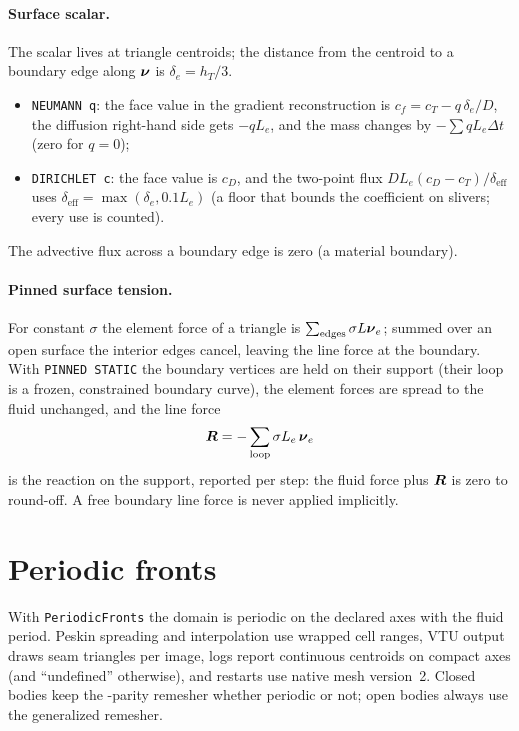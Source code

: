 \paragraph{Surface scalar.} The scalar lives at triangle centroids; the distance from the centroid
to a boundary edge along $\boldsymbol{\nu}$ is $\delta_e=h_T/3$.
\begin{itemize}
  \item \texttt{NEUMANN q}: the face value in the gradient reconstruction is
    $c_f=c_T-q\,\delta_e/D$, the diffusion right-hand side gets $-qL_e$, and the mass changes by
    $-\sum qL_e\Delta t$ (zero for $q=0$);
  \item \texttt{DIRICHLET c}: the face value is $c_D$, and the two-point flux
    $D L_e(c_D-c_T)/\delta_{\text{eff}}$ uses $\delta_{\text{eff}}=\max(\delta_e,0.1L_e)$ (a floor
    that bounds the coefficient on slivers; every use is counted).
\end{itemize}
The advective flux across a boundary edge is zero (a material boundary).

\paragraph{Pinned surface tension.} For constant $\sigma$ the element force of a triangle is
$\sum_{\text{edges}}\sigma L\boldsymbol{\nu}_e$; summed over an open surface the interior edges cancel,
leaving the line force at the boundary. With \texttt{PINNED STATIC} the boundary vertices are held
on their support (their loop is a frozen, constrained boundary curve), the element forces are
spread to the fluid unchanged, and the line force
\begin{equation}
  \boldsymbol{R} = -\sum_{\text{loop}} \sigma L_e\,\boldsymbol{\nu}_e
\end{equation}
is the reaction on the support, reported per step: the fluid force plus $\boldsymbol{R}$ is zero to
round-off. A free boundary line force is never applied implicitly.

\section{Periodic fronts}

With \texttt{PeriodicFronts} the \mftl{} domain is periodic on the declared axes with the fluid
period. Peskin spreading and interpolation use wrapped cell ranges, VTU output draws seam
triangles per image, logs report continuous centroids on compact axes (and ``undefined''
otherwise), and restarts use native mesh version~2. Closed bodies keep the \mftlone-parity remesher
whether periodic or not; open bodies always use the generalized remesher.
